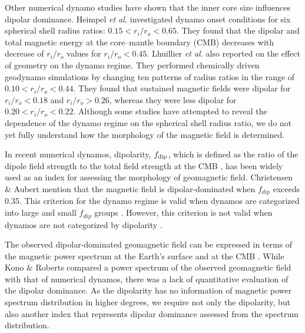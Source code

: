 Other numerical dynamo studies have shown that the inner core size influences dipolar dominance. Heimpel {\it et al.}  investigated dynamo onset conditions for six spherical shell radius ratios: $0.15 < r_{i} / r_{o} < 0.65$. 
They found that the dipolar and total magnetic energy at the core–mantle boundary (CMB) decreases with decrease of $r_{i} / r_{o}$ values for $r_{i} / r_{o} < 0.45$. 
Lhuillier {\it et al.}  also reported on the effect of geometry on the dynamo regime. 
They performed chemically driven geodynamo simulations by changing ten patterns of radius ratios in the range of $0.10 < r_{i} / r_{o} < 0.44$. 
They found that sustained magnetic fields were dipolar for  $r_{i} / r_{o} < 0.18$ and  $r_{i} / r_{o} > 0.26$, whereas they were less dipolar for $0.20 < r_{i} / r_{o} < 0.22$. 
Although some studies have attempted to reveal the dependence of the dynamo regime on the spherical shell radius ratio, we do not yet fully understand how the morphology of the magnetic field is determined.

In recent numerical dynamos, dipolarity, $f_{\rm dip}$, which is defined as the ratio of the dipole field strength to the total field strength at the CMB \cite{Uli:2006}, has been widely used as an index for assessing the morphology of geomagnetic field. 
Christensen \& Aubert  mention that the magnetic field is dipolar-dominated when $f_{dip}$ exceeds 0.35. 
This criterion for the dynamo regime is valid when dynamos are categorized into large and small $f_{dip}$ groups \cite{Soderlund:2012}. 
However, this criterion is not valid when dynamos are not categorized by dipolarity \cite{Aubert:2009}. 

The observed dipolar-dominated geomagnetic field can be expressed in terms of the magnetic power spectrum at the Earth’s surface \cite{Lowes:1974} and at the CMB \cite{Langel:1982}. 
While Kono \& Roberts  compared a power spectrum of the observed geomagnetic field with that of numerical dynamos, there was a lack of quantitative evaluation of the dipolar dominance. 
As the dipolarity has no information of magnetic power spectrum distribution in higher degrees, we require not only the dipolarity, but also another index that represents dipolar dominance assessed from the spectrum distribution.

